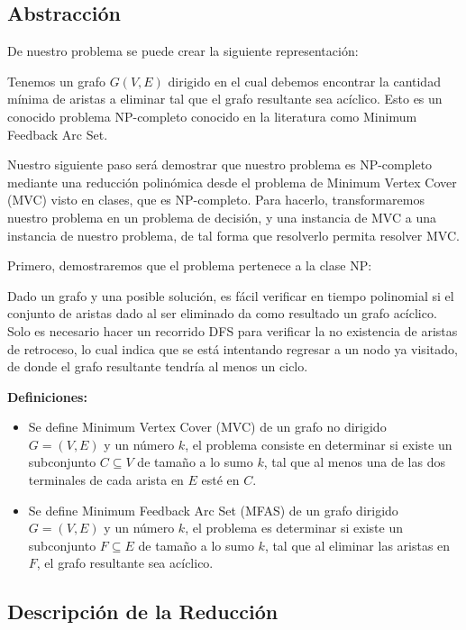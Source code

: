 \documentclass{article}
\begin{document}
\subsection{Abstracción}

De nuestro problema se puede crear la siguiente representación:

Tenemos un grafo $G(V,E)$ dirigido en el cual debemos encontrar la cantidad mínima de aristas a eliminar tal que el grafo resultante sea acíclico. Esto es un conocido problema NP-completo conocido en la literatura como Minimum Feedback Arc Set.

Nuestro siguiente paso será demostrar que nuestro problema es NP-completo mediante una reducción polinómica desde el problema de Minimum Vertex Cover (MVC) visto en clases, que es NP-completo. Para hacerlo, transformaremos nuestro problema en un problema de decisión, y una instancia de MVC a una instancia de nuestro problema, de tal forma que resolverlo permita resolver MVC.

Primero, demostraremos que el problema pertenece a la clase NP:

Dado un grafo y una posible solución, es fácil verificar en tiempo polinomial si el conjunto de aristas dado al ser eliminado da como resultado un grafo acíclico. Solo es necesario hacer un recorrido DFS para verificar la no existencia de aristas de retroceso, lo cual indica que se está intentando regresar a un nodo ya visitado, de donde el grafo resultante tendría al menos un ciclo.

\textbf{Definiciones:}

\begin{itemize}
    \item Se define Minimum Vertex Cover (MVC) de un grafo no dirigido $G = (V, E)$ y un número $ k $, el problema consiste en determinar si existe un subconjunto $ C \subseteq V $ de tamaño a lo sumo $ k $, tal que al menos una de las dos terminales de cada arista en $ E $ esté en $ C $.
    \item Se define Minimum Feedback Arc Set (MFAS) de un grafo dirigido $ G = (V, E) $ y un número $ k $, el problema es determinar si existe un subconjunto $ F \subseteq E $ de tamaño a lo sumo $ k $, tal que al eliminar las aristas en $ F $, el grafo resultante sea acíclico.
\end{itemize}


\subsection{Descripción de la Reducción}
\end{document}

